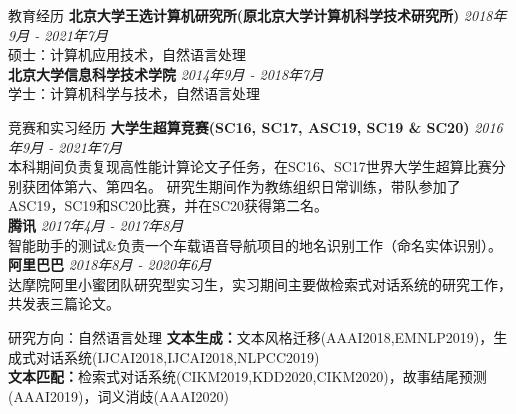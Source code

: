 \documentclass{resume} %
\begin{document}



\begin{rSection}{教育经历}
    {\bf 北京大学王选计算机研究所(原北京大学计算机科学技术研究所)} \hfill {\em 2018年9月 - 2021年7月} 
    \\ 硕士：计算机应用技术，自然语言处理 \\
    {\bf 北京大学信息科学技术学院} \hfill {\em 2014年9月 - 2018年7月}
    \\ 学士：计算机科学与技术，自然语言处理
\end{rSection}

\vspace{-0.2cm}
\begin{rSection}{竞赛和实习经历}
    \textbf{大学生超算竞赛(SC16, SC17, ASC19, SC19 \& SC20)} \hfill {\em 2016年9月 - 2021年7月}\\
    本科期间负责复现高性能计算论文子任务，在SC16、SC17世界大学生超算比赛分别获团体第六、第四名。
    研究生期间作为教练组织日常训练，带队参加了ASC19，SC19和SC20比赛，并在SC20获得第二名。 \\
    \textbf{腾讯} \hfill {\em 2017年4月 - 2017年8月} \\
    智能助手的测试\&负责一个车载语音导航项目的地名识别工作（命名实体识别）。\\
    \textbf{阿里巴巴} \hfill {\em 2018年8月 - 2020年6月}\\
    达摩院阿里小蜜团队研究型实习生，实习期间主要做检索式对话系统的研究工作，共发表三篇论文。
\end{rSection}

\vspace{-0.2cm}
\begin{rSection}{研究方向：自然语言处理}
    \textbf{文本生成：}文本风格迁移(AAAI2018,EMNLP2019)，生成式对话系统(IJCAI2018,IJCAI2018,NLPCC2019) \\
    \textbf{文本匹配：}检索式对话系统(CIKM2019,KDD2020,CIKM2020)，故事结尾预测(AAAI2019)，词义消歧(AAAI2020)
\end{rSection}
\end{document}
